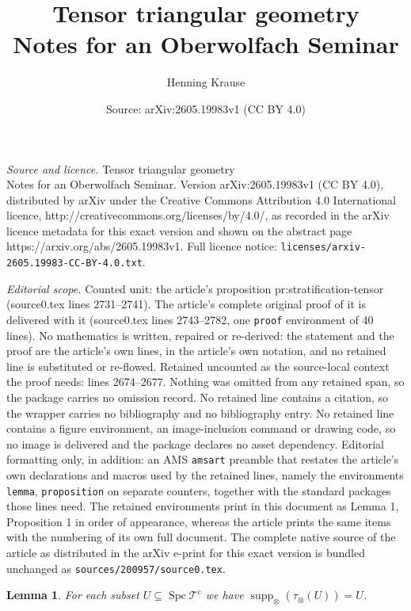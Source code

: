 \documentclass[10pt,a4paper]{amsart}
\title{Tensor triangular geometry\\ Notes for an Oberwolfach Seminar}
\author{Henning Krause}
\date{Source: arXiv:2605.19983v1 (CC BY 4.0)}
\newtheorem{lemma}{Lemma}
\newcommand{\Spc}{\operatorname{Spc}}
\newcommand{\cat}{\mathcal}
\newcommand{\supp}{\operatorname{supp}}
\begin{document}
\maketitle

\noindent\emph{Source and licence.} Tensor triangular geometry\\ Notes for an Oberwolfach Seminar. Version arXiv:2605.19983v1 (CC BY 4.0), distributed by arXiv under the Creative Commons Attribution 4.0 International licence, http://creativecommons.org/licenses/by/4.0/, as recorded in the arXiv licence metadata for this exact version and shown on the abstract page https://arxiv.org/abs/2605.19983v1. Full licence notice: \texttt{licenses/arxiv-2605.19983-CC-BY-4.0.txt}.\par\smallskip

\noindent\textit{Editorial scope.} Counted unit: the article's proposition pr:stratification-tensor (source0.tex lines 2731--2741). The article's complete original proof of it is delivered with it (source0.tex lines 2743--2782, one \texttt{proof} environment of 40 lines). No mathematics is written, repaired or re-derived: the statement and the proof are the article's own lines, in the article's own notation, and no retained line is substituted or re-flowed.  Retained uncounted as the source-local context the proof needs: lines 2674--2677.  Nothing was omitted from any retained span, so the package carries no omission record.  No retained line contains a citation, so the wrapper carries no bibliography and no bibliography entry.  No retained line contains a figure environment, an image-inclusion command or drawing code, so no image is delivered and the package declares no asset dependency.  Editorial formatting only, in addition: an AMS \texttt{amsart} preamble that restates the article's own declarations and macros used by the retained lines, namely the environments \texttt{lemma}, \texttt{proposition} on separate counters, together with the standard packages those lines need.  The retained environments print in this document as Lemma 1, Proposition 1 in order of appearance, whereas the article prints the same items with the numbering of its own full document.  The complete native source of the article as distributed in the arXiv e-print for this exact version is bundled unchanged as \texttt{sources/200957/source0.tex}.
\begin{lemma}\label{le:tensor-supp-surjective}
  For each subset $U\subseteq \Spc\cat T^{\mathrm c}$ we have
  $\supp_\otimes(\tau_\otimes(U))=U$.
\end{lemma}
\end{document}
